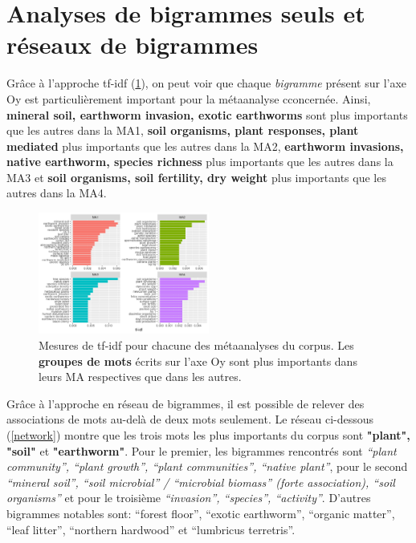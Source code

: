 \documentclass{book}
\begin{document}
\section{Analyses de bigrammes seuls et réseaux de bigrammes}
\noindent
Grâce à l'approche tf-idf (\cref{bi_tf_idf}), on peut voir que chaque \textit{bigramme} présent sur l'axe Oy est particulièrement important pour la métaanalyse cconcernée. Ainsi, \textbf{mineral soil, earthworm invasion, exotic earthworms} sont plus importants que les autres dans la MA1, \textbf{soil organisms, plant responses, plant mediated} plus importants que les autres dans la MA2, \textbf{earthworm invasions, native earthworm, species richness} plus importants que les autres dans la MA3 et \textbf{soil organisms, soil fertility, dry weight} plus importants que les autres dans la MA4.
\begin{figure}[htb] %
    \begin{center} %
        \includegraphics[width=0.5\textwidth]{bigrammes_tf_idf.png}
        \caption{Mesures de tf-idf pour chacune des métaanalyses du corpus. Les \textbf{groupes de mots} écrits sur l'axe Oy sont plus importants dans leurs MA respectives que dans les autres.\label{bi_tf_idf}}
    \end{center}  
\end{figure}
\FloatBarrier{}

\newpage
Grâce à l'approche en réseau de bigrammes, il est possible de relever des associations de mots au-delà de deux mots seulement. Le réseau ci-dessous (\cref{network}) montre que les trois mots les plus importants du corpus sont \textbf{"plant", "soil"} et \textbf{"earthworm"}. Pour le premier, les bigrammes rencontrés sont \textit{“plant community”, “plant growth”, “plant communities”, “native plant”}, pour le second \textit{“mineral soil”, “soil microbial” / “microbial biomass” (forte association), “soil organisms”} et pour le troisième \textit{“invasion”, “species”, “activity”}. D’autres bigrammes notables sont: “forest floor”, “exotic earthworm”, “organic matter”, “leaf litter”, “northern hardwood” et “lumbricus terretris”.
\end{document}
